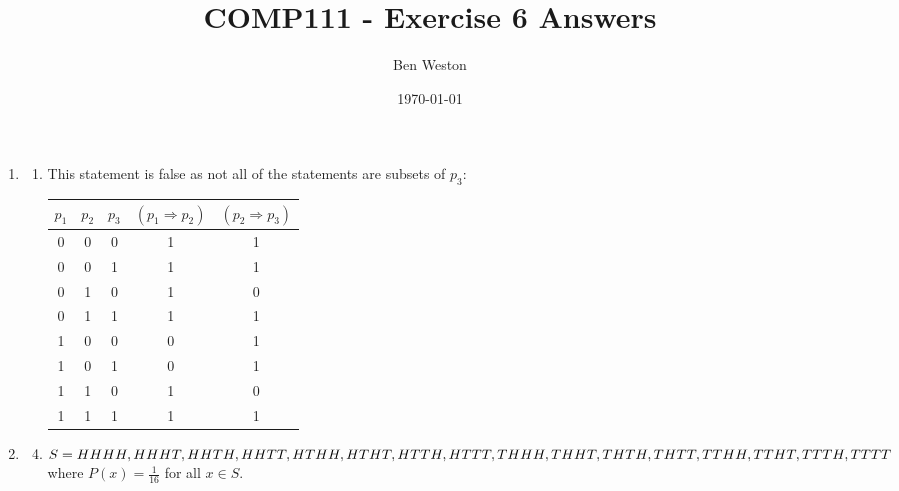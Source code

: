 \documentclass{article}
\title{COMP111 - Exercise 6 Answers}
\author{Ben Weston}
\date{\today}
\begin{document}
\maketitle
\begin{enumerate}
        \item
                \begin{enumerate}
                        \item This statement is false as not all of the statements are subsets of $p_3$:
                                \begin{table}[H]
                                        \centering
                                        \begin{tabular}{|c|c|c|c|c|}
                                                \hline
                                                $p_1$ & $p_2$ & $p_3$ & $(p_1\Rightarrow p_2)$ & $(p_2\Rightarrow p_3)$\\
                                                \hline\hline
                                                0 & 0 & 0 & 1 & 1\\
                                                \hline
                                                0 & 0 & 1 & 1 & 1\\
                                                \hline
                                                0 & 1 & 0 & 1 & 0\\
                                                \hline
                                                0 & 1 & 1 & 1 & 1\\
                                                \hline
                                                1 & 0 & 0 & 0 & 1\\
                                                \hline
                                                1 & 0 & 1 & 0 & 1\\
                                                \hline
                                                1 & 1 & 0 & 1 & 0\\
                                                \hline
                                                1 & 1 & 1 & 1 & 1\\
                                                \hline
                                        \end{tabular}
                                \end{table}
                \end{enumerate}
                \setcounter{enumi}{2}
        \item
                \begin{enumerate}\setcounter{enumii}{3}
                        \item $S=\\{HHHH,HHHT,HHTH,HHTT,HTHH,HTHT,HTTH,\\HTTT,THHH,THHT,THTH,THTT,TTHH,TTHT,TTTH,\\TTTT\\}$ where $P(x)=\frac{1}{16}$ for all $x\in S$.


\end{enumerate}
\end{enumerate}
\end{document}
